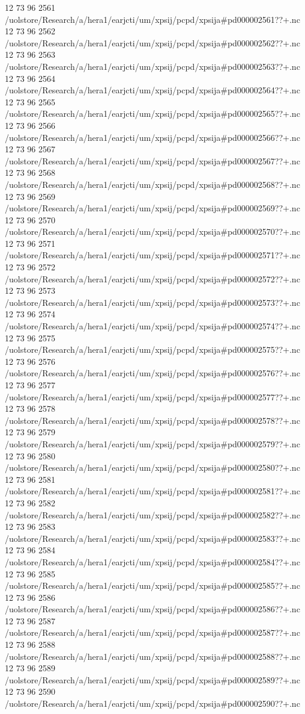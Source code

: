 12 73 96
2561
/uolstore/Research/a/hera1/earjcti/um/xpsij/pcpd/xpsija#pd000002561??+.nc
12 73 96
2562
/uolstore/Research/a/hera1/earjcti/um/xpsij/pcpd/xpsija#pd000002562??+.nc
12 73 96
2563
/uolstore/Research/a/hera1/earjcti/um/xpsij/pcpd/xpsija#pd000002563??+.nc
12 73 96
2564
/uolstore/Research/a/hera1/earjcti/um/xpsij/pcpd/xpsija#pd000002564??+.nc
12 73 96
2565
/uolstore/Research/a/hera1/earjcti/um/xpsij/pcpd/xpsija#pd000002565??+.nc
12 73 96
2566
/uolstore/Research/a/hera1/earjcti/um/xpsij/pcpd/xpsija#pd000002566??+.nc
12 73 96
2567
/uolstore/Research/a/hera1/earjcti/um/xpsij/pcpd/xpsija#pd000002567??+.nc
12 73 96
2568
/uolstore/Research/a/hera1/earjcti/um/xpsij/pcpd/xpsija#pd000002568??+.nc
12 73 96
2569
/uolstore/Research/a/hera1/earjcti/um/xpsij/pcpd/xpsija#pd000002569??+.nc
12 73 96
2570
/uolstore/Research/a/hera1/earjcti/um/xpsij/pcpd/xpsija#pd000002570??+.nc
12 73 96
2571
/uolstore/Research/a/hera1/earjcti/um/xpsij/pcpd/xpsija#pd000002571??+.nc
12 73 96
2572
/uolstore/Research/a/hera1/earjcti/um/xpsij/pcpd/xpsija#pd000002572??+.nc
12 73 96
2573
/uolstore/Research/a/hera1/earjcti/um/xpsij/pcpd/xpsija#pd000002573??+.nc
12 73 96
2574
/uolstore/Research/a/hera1/earjcti/um/xpsij/pcpd/xpsija#pd000002574??+.nc
12 73 96
2575
/uolstore/Research/a/hera1/earjcti/um/xpsij/pcpd/xpsija#pd000002575??+.nc
12 73 96
2576
/uolstore/Research/a/hera1/earjcti/um/xpsij/pcpd/xpsija#pd000002576??+.nc
12 73 96
2577
/uolstore/Research/a/hera1/earjcti/um/xpsij/pcpd/xpsija#pd000002577??+.nc
12 73 96
2578
/uolstore/Research/a/hera1/earjcti/um/xpsij/pcpd/xpsija#pd000002578??+.nc
12 73 96
2579
/uolstore/Research/a/hera1/earjcti/um/xpsij/pcpd/xpsija#pd000002579??+.nc
12 73 96
2580
/uolstore/Research/a/hera1/earjcti/um/xpsij/pcpd/xpsija#pd000002580??+.nc
12 73 96
2581
/uolstore/Research/a/hera1/earjcti/um/xpsij/pcpd/xpsija#pd000002581??+.nc
12 73 96
2582
/uolstore/Research/a/hera1/earjcti/um/xpsij/pcpd/xpsija#pd000002582??+.nc
12 73 96
2583
/uolstore/Research/a/hera1/earjcti/um/xpsij/pcpd/xpsija#pd000002583??+.nc
12 73 96
2584
/uolstore/Research/a/hera1/earjcti/um/xpsij/pcpd/xpsija#pd000002584??+.nc
12 73 96
2585
/uolstore/Research/a/hera1/earjcti/um/xpsij/pcpd/xpsija#pd000002585??+.nc
12 73 96
2586
/uolstore/Research/a/hera1/earjcti/um/xpsij/pcpd/xpsija#pd000002586??+.nc
12 73 96
2587
/uolstore/Research/a/hera1/earjcti/um/xpsij/pcpd/xpsija#pd000002587??+.nc
12 73 96
2588
/uolstore/Research/a/hera1/earjcti/um/xpsij/pcpd/xpsija#pd000002588??+.nc
12 73 96
2589
/uolstore/Research/a/hera1/earjcti/um/xpsij/pcpd/xpsija#pd000002589??+.nc
12 73 96
2590
/uolstore/Research/a/hera1/earjcti/um/xpsij/pcpd/xpsija#pd000002590??+.nc
